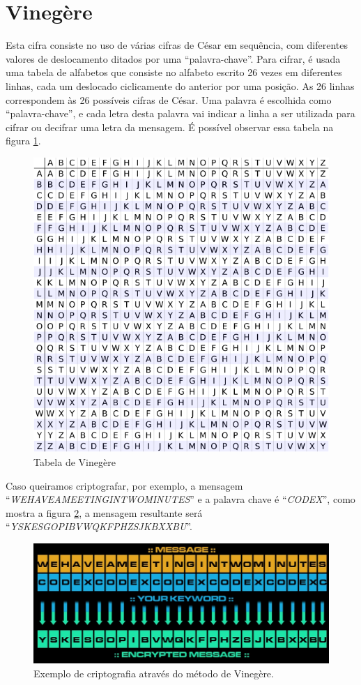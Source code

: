 \documentclass[
article,			%
11pt,				%
oneside,			%
a4paper,			%
english,			%
brazil,				%
sumario=tradicional
]{abntex2}
\begin{document}
		
	\section{Vinegère}
		Esta cifra consiste no uso de várias cifras de César em sequência, com diferentes valores de deslocamento ditados por uma ``palavra-chave''. Para cifrar, é usada uma tabela de alfabetos que consiste no alfabeto escrito 26 vezes em diferentes linhas, cada um deslocado ciclicamente do anterior por uma posição. As 26 linhas correspondem às 26 possíveis cifras de César. Uma palavra é escolhida como ``palavra-chave'', e cada letra desta palavra vai indicar a linha a ser utilizada para cifrar ou decifrar uma letra da mensagem. É possível observar essa tabela na figura \ref{fig:vinegere}.		
		
		\begin{figure}[!h]
			\centering
			\includegraphics[width=0.7\linewidth]{Imagens/vinegere}
			\caption{Tabela de Vinegère}
			\label{fig:vinegere}
		\end{figure}

		
		Caso queiramos criptografar, por exemplo, a mensagem ``\textit{WEHAVEAMEETINGINTWOMINUTES}'' e a palavra chave é ``\textit{CODEX}'', como mostra a figura \ref{fig:venegere2}, a mensagem resultante será ``\textit{YSKESGOPIBVWQKFPHZSJKBXXBU}''.
			
		\begin{figure} [h!]
			\centering
			\includegraphics[width=0.7\linewidth]{Imagens/vinegere2.png}
			\caption{Exemplo de criptografia através do método de Vinegère.}
			\label{fig:venegere2}
		\end{figure}
		
\end{document}
